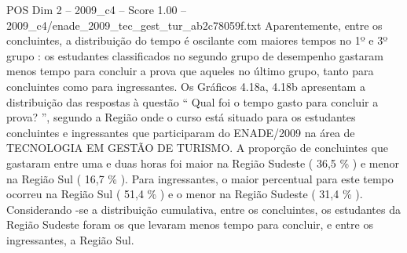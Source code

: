 \begin{textsample}{POS Dim 2 – 2009\_c4 – Score 1.00 – 2009\_c4/enade\_2009\_tec\_gest\_tur\_ab2c78059f.txt}
Aparentemente, entre os concluintes, a distribuição do tempo é oscilante com maiores tempos no 1º e 3º grupo : os estudantes classificados no segundo grupo de desempenho gastaram menos tempo para concluir a prova que aqueles no último grupo, tanto para concluintes como para ingressantes.
Os Gráficos 4.18a, 4.18b apresentam a distribuição das respostas à questão “ Qual foi o tempo gasto para concluir a prova? ”, segundo a Região onde o curso está situado para os estudantes concluintes e ingressantes que participaram do ENADE/2009 na área de TECNOLOGIA EM GESTÃO DE TURISMO.
A proporção de concluintes que gastaram entre uma e duas horas foi maior na Região Sudeste ( 36,5 \% ) e menor na Região Sul ( 16,7 \% ).
Para ingressantes, o maior percentual para este tempo ocorreu na Região Sul ( 51,4 \% ) e o menor na Região Sudeste ( 31,4 \% ).
Considerando -se a distribuição cumulativa, entre os concluintes, os estudantes da Região Sudeste foram os que levaram menos tempo para concluir, e entre os ingressantes, a Região Sul.

\end{textsample}
